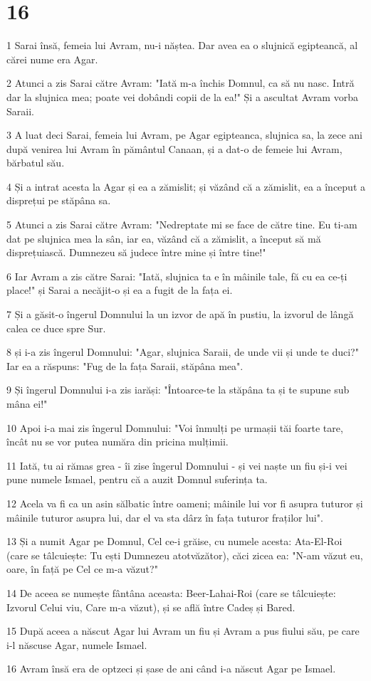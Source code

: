 \chapter{16}

\par 1 Sarai însă, femeia lui Avram, nu-i năștea. Dar avea ea o slujnică egipteancă, al cărei nume era Agar.
\par 2 Atunci a zis Sarai către Avram: "Iată m-a închis Domnul, ca să nu nasc. Intră dar la slujnica mea; poate vei dobândi copii de la ea!" Și a ascultat Avram vorba Saraii.
\par 3 A luat deci Sarai, femeia lui Avram, pe Agar egipteanca, slujnica sa, la zece ani după venirea lui Avram în pământul Canaan, și a dat-o de femeie lui Avram, bărbatul său.
\par 4 Și a intrat acesta la Agar și ea a zămislit; și văzând că a zămislit, ea a început a disprețui pe stăpâna sa.
\par 5 Atunci a zis Sarai către Avram: "Nedreptate mi se face de către tine. Eu ti-am dat pe slujnica mea la sân, iar ea, văzând că a zămislit, a început să mă disprețuiască. Dumnezeu să judece între mine și între tine!"
\par 6 Iar Avram a zis către Sarai: "Iată, slujnica ta e în mâinile tale, fă cu ea ce-ți place!" și Sarai a necăjit-o și ea a fugit de la fața ei.
\par 7 Și a găsit-o îngerul Domnului la un izvor de apă în pustiu, la izvorul de lângă calea ce duce spre Sur.
\par 8 și i-a zis îngerul Domnului: "Agar, slujnica Saraii, de unde vii și unde te duci?" Iar ea a răspuns: "Fug de la fața Saraii, stăpâna mea".
\par 9 Și îngerul Domnului i-a zis iarăși: "Întoarce-te la stăpâna ta și te supune sub mâna ei!"
\par 10 Apoi i-a mai zis îngerul Domnului: "Voi înmulți pe urmașii tăi foarte tare, încât nu se vor putea număra din pricina mulțimii.
\par 11 Iată, tu ai rămas grea - îi zise îngerul Domnului - și vei naște un fiu și-i vei pune numele Ismael, pentru că a auzit Domnul suferința ta.
\par 12 Acela va fi ca un asin sălbatic între oameni; mâinile lui vor fi asupra tuturor și mâinile tuturor asupra lui, dar el va sta dârz în fața tuturor fraților lui".
\par 13 Și a numit Agar pe Domnul, Cel ce-i grăise, cu numele acesta: Ata-El-Roi (care se tâlcuiește: Tu ești Dumnezeu atotvăzător), căci zicea ea: "N-am văzut eu, oare, în față pe Cel ce m-a văzut?"
\par 14 De aceea se numește fântâna aceasta: Beer-Lahai-Roi (care se tâlcuiește: Izvorul Celui viu, Care m-a văzut), și se află între Cadeș și Bared.
\par 15 După aceea a născut Agar lui Avram un fiu și Avram a pus fiului său, pe care i-l născuse Agar, numele Ismael.
\par 16 Avram însă era de optzeci și șase de ani când i-a născut Agar pe Ismael.

